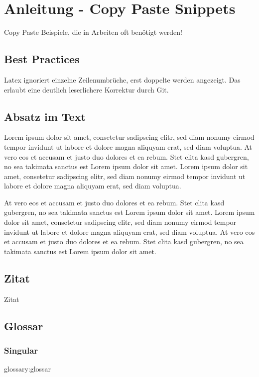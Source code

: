 
\chapter{Anleitung - Copy Paste Snippets}

Copy Paste Beispiele, die in Arbeiten oft benötigt werden!

\section{Best Practices}
\begin{description}[style=nextline]
	\item[1 Satz pro Zeile]  
	Latex ignoriert einzelne Zeilenumbrüche, erst doppelte werden angezeigt.
	Das erlaubt eine deutlich leserlichere Korrektur durch Git.
\end{description}

\section{Absatz im Text}
Lorem ipsum dolor sit amet, consetetur sadipscing elitr, sed diam nonumy eirmod tempor invidunt ut labore et dolore magna aliquyam erat, sed diam voluptua. At vero eos et accusam et justo duo dolores et ea rebum. Stet clita kasd gubergren, no sea takimata sanctus est Lorem ipsum dolor sit amet. Lorem ipsum dolor sit amet, consetetur sadipscing elitr, sed diam nonumy eirmod tempor invidunt ut labore et dolore magna aliquyam erat, sed diam voluptua.
\newline

At vero eos et accusam et justo duo dolores et ea rebum. Stet clita kasd gubergren, no sea takimata sanctus est Lorem ipsum dolor sit amet. Lorem ipsum dolor sit amet, consetetur sadipscing elitr, sed diam nonumy eirmod tempor invidunt ut labore et dolore magna aliquyam erat, sed diam voluptua. At vero eos et accusam et justo duo dolores et ea rebum. Stet clita kasd gubergren, no sea takimata sanctus est Lorem ipsum dolor sit amet.

\section{Zitat}
Zitat \cite{beispiel}

\section{Glossar}
\subsection{Singular}
\Gls{glossary:glossar}
